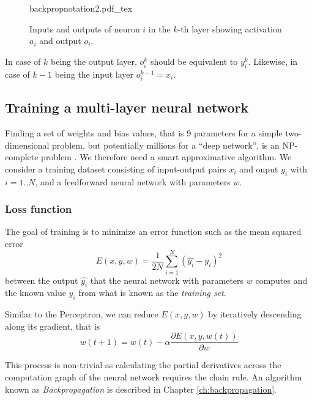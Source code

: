 \begin{figure}[htb]
    \centering
    \def\svgwidth{0.7\textwidth}
    {backpropnotation2.pdf_tex}
    \caption{Inputs and outputs of neuron $i$ in the $k$-th layer showing activation $a_i$ and output $o_i$.\label{fig:backpropnotation2}}
\end{figure}

In case of $k$ being the output layer, $o_i^k$ should be equivalent to $y_i^k$. Likewise, in case of $k-1$ being the input layer $o_i^{k-1}=x_i$.

\subsection{Training a multi-layer neural network}

Finding a set of weights and bias values, that is 9 parameters for a simple two-dimensional problem, but potentially millions for a ``deep network'', is an NP-complete problem \cite{blum1992training}. We therefore need a smart approximative algorithm. We consider a training dataset consisting of input-output pairs $x_i$ and ouput $y_i$ with $i=1..N$, and a feedforward neural network with parameters $w$.

\subsubsection{Loss function}\label{sec:lossfunction}
The goal of training is to minimize an error function such as the mean squared error
\begin{equation}
E(x,y,w)=\frac{1}{2N}\sum_{i=1}^{N}(\hat{y_i}-y_i)^2
\end{equation}
between the output $\hat{y_i}$ that the neural network with parameters $w$ computes and the known value $y_i$ from what is known as the \textsl{training set}.

Similar to the Perceptron, we can reduce $E(x,y,w)$ by iteratively descending along its gradient, that is
\begin{equation}
w(t+1)=w(t)-\alpha \frac{\partial E(x,y,w(t))}{\partial w}
\end{equation}

This process is non-trivial as calculating the partial derivatives across the computation graph of the neural network requires the chain rule. An algorithm known as \emph{Backpropagation} is described in Chapter \ref{ch:backpropagation}.


